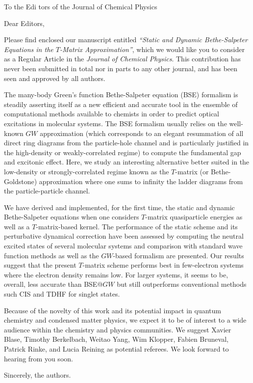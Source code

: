 \documentclass[10pt]{letter}
\begin{document}
\begin{letter}%
{To the Edi	tors of the Journal of Chemical Physics}

\opening{Dear Editors,}

\justifying
Please find enclosed our manuscript entitled \textit{``Static and Dynamic Bethe-Salpeter Equations in the $T$-Matrix Approximation''}, which we would like you to consider as a Regular Article in the \textit{Journal of Chemical Physics}.
This contribution has never been submitted in total nor in parts to any other journal, and has been seen and approved by all authors.

The many-body Green's function Bethe-Salpeter equation (BSE) formalism is steadily asserting itself as a new efficient and accurate tool in the ensemble of computational methods available to chemists in order to predict optical excitations in molecular systems.
The BSE formalism usually relies on the well-known $GW$ approximation (which corresponds to an elegant resummation of all direct ring diagrams from the particle-hole channel and is particularly justified in the high-density or weakly-correlated regime) to compute the fundamental gap and excitonic effect. 
Here, we study an interesting alternative better suited in the low-density or strongly-correlated regime known as the $T$-matrix (or Bethe-Goldstone) approximation where one sums to infinity the ladder diagrams from the particle-particle channel.
 
We have derived and implemented, for the first time, the static and dynamic Bethe-Salpeter equations when one considers $T$-matrix quasiparticle energies as well as a $T$-matrix-based kernel. 
The performance of the static scheme and its perturbative dynamical correction have been assessed by computing the neutral excited states of several molecular systems and comparison with standard wave function methods as well as the $GW$-based formalism are presented.
Our results suggest that the present $T$-matrix scheme performs best in few-electron systems where the electron density remains low.
For larger systems, it seems to be, overall, less accurate than BSE@$GW$ but still outperforms conventional methods such CIS and TDHF for singlet states.

Because of the novelty of this work and its potential impact in quantum chemistry and condensed matter physics, we expect it to be of interest to a wide audience within the chemistry and physics communities.
We suggest Xavier Blase, Timothy Berkelbach, Weitao Yang, Wim Klopper, Fabien Bruneval, Patrick Rinke, and Lucia Reining as potential referees.
We look forward to hearing from you soon.

\closing{Sincerely, the authors.}

\end{letter}
\end{document}

